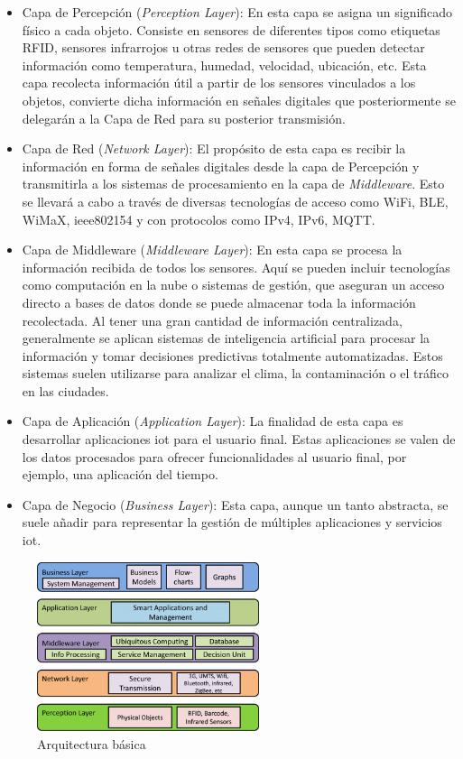 \begin{itemize}


    \item Capa de Percepción (\textit{Perception Layer}): En esta capa se asigna un significado físico a cada objeto. Consiste en sensores de diferentes tipos como etiquetas RFID, sensores infrarrojos u otras redes de sensores que pueden detectar información como temperatura, humedad, velocidad, ubicación, etc. Esta capa recolecta información útil a partir de los sensores vinculados a los objetos, convierte dicha información en señales digitales que posteriormente se delegarán a la Capa de Red para su posterior transmisión.

    \item Capa de Red (\textit{Network Layer}): El propósito de esta capa es recibir la información en forma de señales digitales desde la capa de Percepción y transmitirla a los sistemas de procesamiento en la capa de \textit{Middleware}. Esto se llevará a cabo a través de diversas tecnologías de acceso como WiFi, BLE, WiMaX, ieee802154 y con protocolos como IPv4, IPv6, MQTT.

    \item Capa de Middleware (\textit{Middleware Layer}): En esta capa se procesa la información recibida de todos los sensores. Aquí se pueden incluir tecnologías como computación en la nube o sistemas de gestión, que aseguran un acceso directo a bases de datos donde se puede almacenar toda la información recolectada. Al tener una gran cantidad de información centralizada, generalmente se aplican sistemas de inteligencia artificial para procesar la información y tomar decisiones predictivas totalmente automatizadas. Estos sistemas suelen utilizarse para analizar el clima, la contaminación o el tráfico en las ciudades.

    \item Capa de Aplicación (\textit{Application Layer}): La finalidad de esta capa es desarrollar aplicaciones \gls{iot} para el usuario final. Estas aplicaciones se valen de los datos procesados para ofrecer funcionalidades al usuario final, por ejemplo, una aplicación del tiempo.

    \item Capa de Negocio (\textit{Business Layer}): Esta capa, aunque un tanto abstracta, se suele añadir para representar la gestión de múltiples aplicaciones y servicios \gls{iot}.


\end{itemize}

\begin{figure}[ht]
    \centering
    \includegraphics[width=6.5cm]{archivos/img/teoria/arch_edited.png}
    \caption{Arquitectura básica   \cite{carrascal2020diseno}}
    \label{fig:iotBasicArch}
\end{figure}
